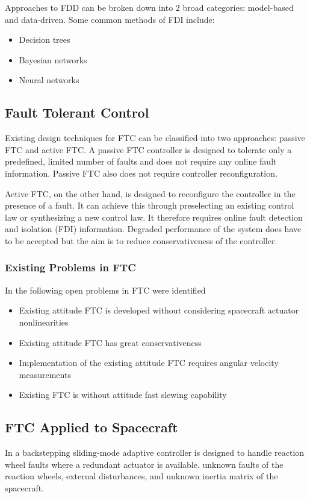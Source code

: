 Approaches to FDD can be broken down into 2 broad categories: model-based and data-driven. Some common methods of FDI include:
\begin{itemize}
    \item Decision trees
    \item Bayesian networks
    \item Neural networks
\end{itemize}

\subsection{Fault Tolerant Control}
Existing design techniques for FTC can be classified into two approaches: passive FTC and active FTC. A passive FTC controller is designed to tolerate only a predefined, limited number of faults and does not require any online fault information. Passive FTC also does not require controller reconfiguration. \cite{yinReviewRecentDevelopment2016}

Active FTC, on the other hand, is designed to reconfigure the controller in the presence of a fault. It can achieve this through preselecting an existing control law or synthesizing a new control law. It therefore requires online fault detection and isolation (FDI) information. Degraded performance of the system does have to be accepted but the aim is to reduce conservativeness of the controller. \cite{yinReviewRecentDevelopment2016}

\subsubsection{Existing Problems in FTC}
In \cite{yinReviewRecentDevelopment2016} the following open problems in FTC were identified
\begin{itemize}
\item Existing attitude FTC is developed without considering spacecraft actuator nonlinearities
\item Existing attitude FTC has great conservativeness
\item Implementation of the existing attitude FTC requires angular velocity measurements
\item Existing FTC is without attitude fast slewing capability
\end{itemize}

\subsection{FTC Applied to Spacecraft}
In \cite{jiangAdaptiveBacksteppingFaulttolerant2010} a backstepping sliding-mode adaptive controller is designed to handle reaction wheel faults where a redundant actuator is available. unknown faults of the reaction wheels, external disturbances, and unknown inertia matrix of the spacecraft. 

